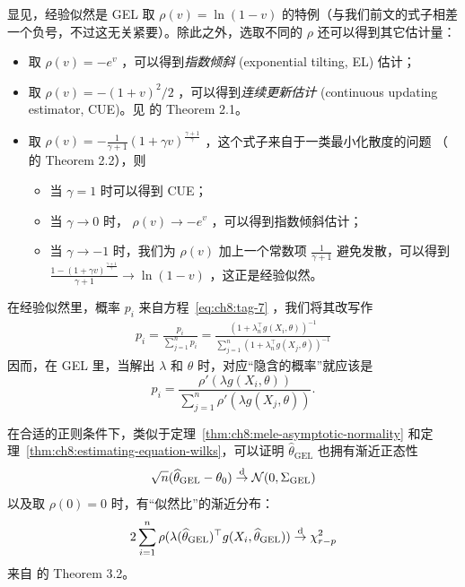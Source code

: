 显见，经验似然是 GEL 取 $\rho(v)=\ln(1-v)$ 的特例（与我们前文的式子相差一个负号，不过这无关紧要）。除此之外，选取不同的 $\rho$ 还可以得到其它估计量：

\begin{itemize}
\tightlist
\item
  取 $\rho(v)=-e^v$ ，可以得到\emph{指数倾斜} (exponential tilting, EL) 估计；
\item
  取 $\rho(v)=-(1+v)^2/2$ ，可以得到\emph{连续更新估计} (continuous updating estimator, CUE)。见 \cite{neweysmith2004} 的 Theorem 2.1。
\item
  取 $\rho(v)=-\frac1{\gamma+1}(1+\gamma v)^{\frac{\gamma+1}{\gamma}}$ ，这个式子来自于一类最小化散度的问题 （\cite{neweysmith2004} 的 Theorem 2.2），则

\begin{itemize}
  \tightlist
  \item
    当 $\gamma=1$ 时可以得到 CUE；
  \item
    当 $\gamma\to 0$ 时， $\rho(v)\to -e^{v}$ ，可以得到指数倾斜估计；
  \item
    当 $\gamma\to -1$ 时，我们为 $\rho(v)$ 加上一个常数项 $\frac{1}{\gamma+1}$ 避免发散，可以得到 $\frac{1-(1+\gamma v)^{\frac{\gamma+1}{\gamma}}}{\gamma+1}\to \ln(1-v)$ ，这正是经验似然。
  \end{itemize}
\end{itemize}

在经验似然里，概率 $p_i$ 来自方程~\eqref{eq:ch8:tag-7} ，我们将其改写作
\[\begin{aligned} p_i =\frac{p_i}{\sum_{j=1}^np_i}=\frac{(1 + \lambda_n^\top g(X_i,\theta))^{-1}}{\sum_{j=1}^n(1 + \lambda_n^\top g(X_j,\theta))^{-1}} \end{aligned}\]
因而，在 GEL 里，当解出 $\lambda$ 和 $\theta$ 时，对应``隐含的概率''就应该是
\[
p_i=\frac{\rho'( \lambda g(X_i,\theta))}{\sum_{j=1}^n\rho'(\lambda g(X_j,\theta))}.
\]

在合适的正则条件下，类似于定理~\ref{thm:ch8:mele-asymptotic-normality} 和定理~\ref{thm:ch8:estimating-equation-wilks}，可以证明 $\widehat\theta_{\text{GEL}}$ 也拥有渐近正态性 \[ \sqrt n(\widehat\theta_{\text{GEL}}-\theta_0)\overset{\rm d}\to\mathcal N(0,\Sigma_{\text{GEL}}) \]以及取 $\rho(0)=0$ 时，有``似然比''的渐近分布： \[ 2\sum_{i=1}^n\rho(\lambda(\widehat\theta_{\text{GEL}})^\top g(X_i,\widehat\theta_{\text{GEL}}))\overset{\rm d}\to \chi^2_{r-p} \]来自 \cite{neweysmith2004} 的 Theorem 3.2。
